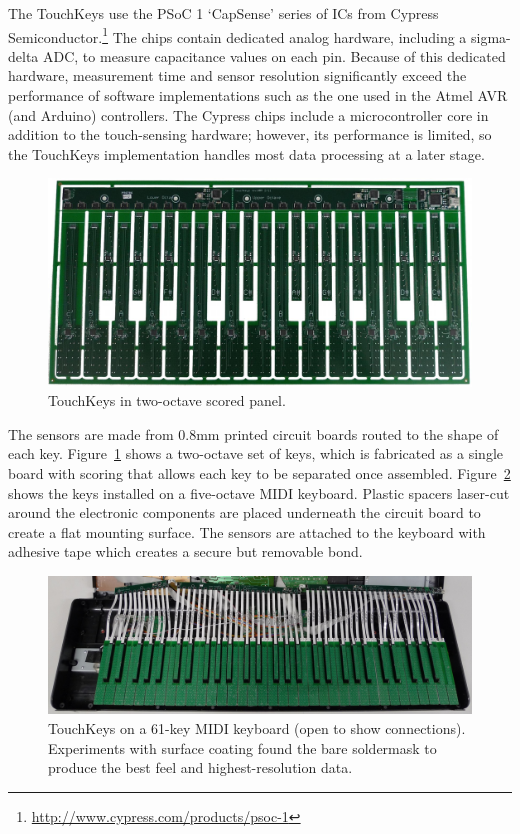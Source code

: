 The TouchKeys use the PSoC 1 `CapSense' series of ICs from Cypress Semiconductor.\footnote{\url{http://www.cypress.com/products/psoc-1}} The chips contain dedicated analog hardware, including a sigma-delta ADC, to measure capacitance values on each pin. Because of this dedicated hardware, measurement time and sensor resolution significantly exceed the performance of software implementations such as the one used in the Atmel AVR (and Arduino) controllers. The Cypress chips include a microcontroller core in addition to the touch-sensing hardware; however, its performance is limited, so the TouchKeys implementation handles most data processing at a later stage.

\begin{figure}[t]
\centering
\includegraphics[width=\columnwidth]{fig2_touchkeys_bottom_small.jpg}
\caption{TouchKeys in two-octave scored panel.}
\label{McPherson:fig:board}
\end{figure}

The sensors are made from 0.8mm printed circuit boards routed to the shape of each key. Figure~\ref{McPherson:fig:board} shows a two-octave set of keys, which is fabricated as a single board with scoring that allows each key to be separated once assembled. Figure~\ref{McPherson:fig:onkeyboard} shows the keys installed on a five-octave MIDI keyboard. Plastic spacers laser-cut around the electronic components are placed underneath the circuit board to create a flat mounting surface. The sensors are attached to the keyboard with adhesive tape which creates a secure but removable bond.

\begin{figure}[t]
\centering
\includegraphics[width=\textwidth]{fig3_touchkeys_on_keyboard.jpg}
\caption{TouchKeys on a 61-key MIDI keyboard (open to show connections). Experiments with surface coating found the bare soldermask to produce the best feel and highest-resolution data.}
\label{McPherson:fig:onkeyboard}
\end{figure}


